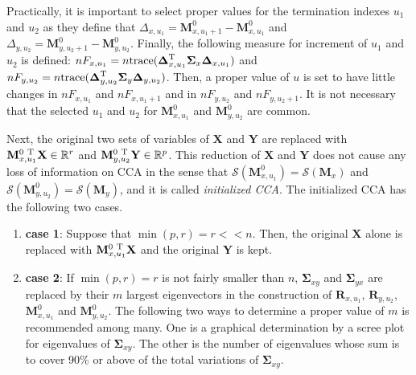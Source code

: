 Practically, it is important to select proper values
for the termination indexes $u_1$ and $u_2$ 
as they define that
$\Delta_{x,u_1}={\mathbf{M}}_{x,u_1 +1}^{0}-{\mathbf{M}}_{x,u_1}^{0}$ and
$\Delta_{y,u_2} ={\mathbf{M}}_{y,u_2 +1}^{0}-{\mathbf{M}}_{y,u_2}^{0}$.
Finally, the following measure for increment of $u_1$ and $u_2$ is defined:
$nF_{x,u_1} = n{\rm trace}({\boldsymbol{\Delta}}_{x,u_1}^{{\rm {T}}}
{\boldsymbol{\Sigma}}_x{\boldsymbol{\Delta}}_{x,u_1})$ and
$nF_{y,u_2} = n{\rm trace}({\boldsymbol{\Delta}}_{y,u_2}^{{\rm {T}}}
{\boldsymbol{\Sigma}}_y{\boldsymbol{\Delta}}_{y,u_2})$.
Then, a proper value of $u$ is set to have little changes in
$nF_{x,u_1}$ and $nF_{x, u_1 +1}$ and in $nF_{y,u_2 }$ and $nF_{y, u_2 +1}$.
It is not necessary that the selected $u_1$ and $u_2$ for
${\mathbf{M}}_{x,u_1}^{0}$ and ${\mathbf{M}}_{y,u_2}^{0}$ are common.

Next, the original two sets of variables of $\mathbf{X}$ and $\mathbf{Y}$
are replaced with ${\mathbf{M}}_{x,u_1}^{0~\rm T}\mathbf{X}\in{\mathbb{R}}^{r}$ and
${\mathbf{M}}_{y,u_2}^{0~{\rm T}}\mathbf{Y}\in{\mathbb{R}}^{p}$.
This reduction of $\mathbf{X}$ and $\mathbf{Y}$
does not cause any loss of information on CCA
in the sense that ${\mathcal{S}}({\mathbf{M}}_{x,u_1}^{0})={\mathcal{S}}(\mathbf{M}_{x})$
and ${\mathcal{S}}({\mathbf{M}}_{y,u_2}^{0})={\mathcal{S}}(\mathbf{M}_{y})$,
and it is called \textit{initialized CCA}.
The initialized CCA has the following two cases.
%
\begin{enumerate}
\item[] \textbf{case 1}: Suppose that $\min(p,r)=r << n$.
Then, the original $\mathbf{X}$ alone is replaced with
${\mathbf{M}}_{x,u_1}^{0~\rm T}\mathbf{X}$ and the original $\mathbf{Y}$ is kept.
\item[]\textbf{case 2}: If $\min(p,r)=r$ is not fairly smaller than $n$,
$\boldsymbol{\Sigma}_{xy}$ and $\boldsymbol{\Sigma}_{yx}$
are replaced by their $m$ largest eigenvectors
in the construction of $\mathbf{R}_{x,u_1}$, $\mathbf{R}_{y,u_2}$,
${\mathbf{M}}_{x,u_1}^{0}$ and ${\mathbf{M}}_{y,u_2}^{0}$.
The following two ways to determine a proper value of $m$
is recommended among many.
One is a graphical determination  by a scree plot for eigenvalues of
${\boldsymbol{\Sigma}}_{xy}$.
The other is the number of eigenvalues whose sum is
to cover 90\% or above of the total variations of ${\boldsymbol{\Sigma}}_{xy}$.
\end{enumerate}

